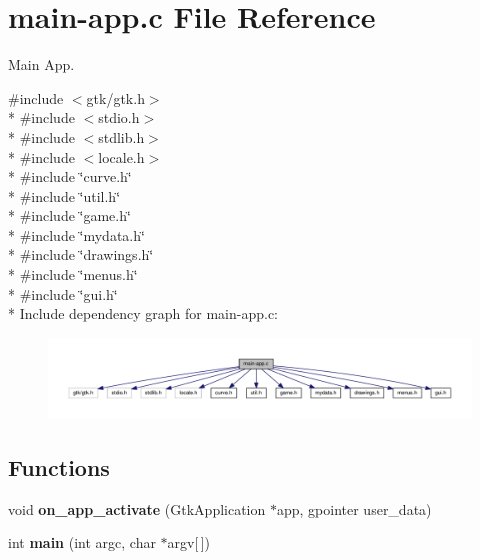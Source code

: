 \hypertarget{main-app_8c}{}\section{main-\/app.c File Reference}
\label{main-app_8c}


Main App.  


{\ttfamily \#include $<$gtk/gtk.\+h$>$}\\*
{\ttfamily \#include $<$stdio.\+h$>$}\\*
{\ttfamily \#include $<$stdlib.\+h$>$}\\*
{\ttfamily \#include $<$locale.\+h$>$}\\*
{\ttfamily \#include \char`\"{}curve.\+h\char`\"{}}\\*
{\ttfamily \#include \char`\"{}util.\+h\char`\"{}}\\*
{\ttfamily \#include \char`\"{}game.\+h\char`\"{}}\\*
{\ttfamily \#include \char`\"{}mydata.\+h\char`\"{}}\\*
{\ttfamily \#include \char`\"{}drawings.\+h\char`\"{}}\\*
{\ttfamily \#include \char`\"{}menus.\+h\char`\"{}}\\*
{\ttfamily \#include \char`\"{}gui.\+h\char`\"{}}\\*
Include dependency graph for main-\/app.c\+:
\nopagebreak
\begin{figure}[H]
\begin{center}
\leavevmode
\includegraphics[width=350pt]{main-app_8c__incl}
\end{center}
\end{figure}
\subsection*{Functions}
\begin{DoxyCompactItemize}
\item 
void {\bfseries on\+\_\+app\+\_\+activate} (Gtk\+Application $\ast$app, gpointer user\+\_\+data)\hypertarget{main-app_8c_a7d38dcf9a1859bd3823a68d1e70c1b16}{}\label{main-app_8c_a7d38dcf9a1859bd3823a68d1e70c1b16}

\item 
int {\bfseries main} (int argc, char $\ast$argv\mbox{[}$\,$\mbox{]})\hypertarget{main-app_8c_a0ddf1224851353fc92bfbff6f499fa97}{}\label{main-app_8c_a0ddf1224851353fc92bfbff6f499fa97}

\end{DoxyCompactItemize}
